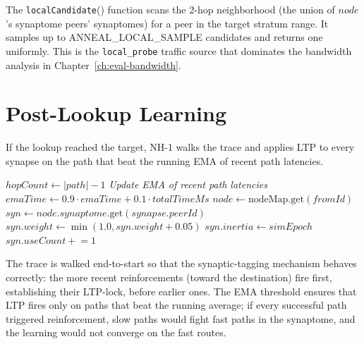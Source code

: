 \documentclass[twoside,nobib]{tufte-book}
\begin{document}
The \texttt{localCandidate}() function scans the 2-hop neighborhood
(the union of $\mathit{node}$'s synaptome peers' synaptomes) for a
peer in the target stratum range. It samples up to
\textsc{ANNEAL\_LOCAL\_SAMPLE} candidates and returns one
uniformly. This is the \texttt{local\_probe} traffic source
that dominates the bandwidth analysis in
Chapter~\ref{ch:eval-bandwidth}.

\section{Post-Lookup Learning}

If the lookup reached the target, NH-1 walks the trace and applies
LTP to every synapse on the path that beat the running EMA of
recent path latencies.

\begin{algorithm}
\caption{post-lookup learning, fires only if reached}
\begin{algorithmic}[1]
\State $\mathit{hopCount} \gets |\mathit{path}| - 1$
\State \emph{Update EMA of recent path latencies}
\State $\mathit{emaTime} \gets 0.9 \cdot \mathit{emaTime} +
       0.1 \cdot \mathit{totalTimeMs}$
    \State $\mathit{node} \gets \mathrm{nodeMap.get}(\mathit{fromId})$
    \State $\mathit{syn} \gets
           \mathit{node}.\mathit{synaptome}.\mathrm{get}(\mathit{synapse}.\mathit{peerId})$
      \State $\mathit{syn}.\mathit{weight} \gets
             \min(1.0, \mathit{syn}.\mathit{weight} + 0.05)$
      \State $\mathit{syn}.\mathit{inertia} \gets
             \mathit{simEpoch}$
      \State $\mathit{syn}.\mathit{useCount} \mathrel{+}= 1$
    \EndIf
  \EndFor
\EndIf
\end{algorithmic}
\end{algorithm}

The trace is walked end-to-start so that the synaptic-tagging
mechanism behaves correctly: the more recent reinforcements
(toward the destination) fire first, establishing their
LTP-lock, before earlier ones. The EMA threshold ensures that
LTP fires only on paths that beat the running average; if every
successful path triggered reinforcement, slow paths would fight
fast paths in the synaptome, and the learning would not converge
on the fast routes.
\end{document}
